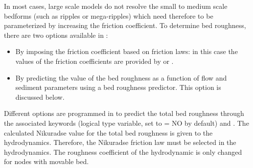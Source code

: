 In most cases, large scale models do not resolve the small to medium
scale bedforms (such as ripples or mega-ripples) which need therefore to be parameterized by increasing the friction coefficient. To determine bed roughness, there are two options available in \gaia{}:
\begin{itemize}
\item By imposing the friction coefficient based on friction laws: in this case the values of the friction coefficients are provided by  or .
\item By predicting the value of the bed roughness as a function of flow and sediment parameters using a bed roughness predictor. This option is discussed below.
\end{itemize}
Different options are programmed in \gaia to predict the total bed
roughness through the associated keywords  (logical type variable, set to {\ttfamily = NO} by default) and . The calculated Nikuradse value for the total bed roughness is given to the hydrodynamics. Therefore, the Nikuradse friction law must be selected in the hydrodynamics. The roughness coefficient of the hydrodynamic is only changed for nodes with movable bed.
